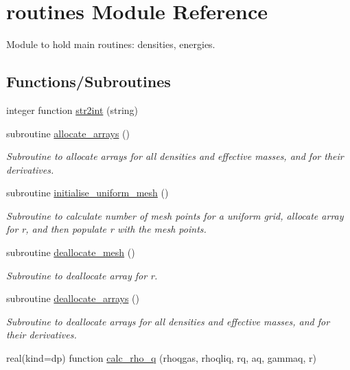 \hypertarget{namespaceroutines}{}\section{routines Module Reference}
\label{namespaceroutines}


Module to hold main routines\+: densities, energies.  


\subsection*{Functions/\+Subroutines}
\begin{DoxyCompactItemize}
\item 
integer function \mbox{\hyperlink{namespaceroutines_a8146fb4359e556bad19f882b8aabfc4b}{str2int}} (string)
\item 
subroutine \mbox{\hyperlink{namespaceroutines_a0d41e4cd4e61ac1463c75055bf784e8b}{allocate\+\_\+arrays}} ()
\begin{DoxyCompactList}\small\item\em Subroutine to allocate arrays for all densities and effective masses, and for their derivatives. \end{DoxyCompactList}\item 
subroutine \mbox{\hyperlink{namespaceroutines_a5caa9b33bdf3c960b6bb3bfa96771181}{initialise\+\_\+uniform\+\_\+mesh}} ()
\begin{DoxyCompactList}\small\item\em Subroutine to calculate number of mesh points for a uniform grid, allocate array for r, and then populate r with the mesh points. \end{DoxyCompactList}\item 
subroutine \mbox{\hyperlink{namespaceroutines_a27ad9ac802069004010c9759fecced92}{deallocate\+\_\+mesh}} ()
\begin{DoxyCompactList}\small\item\em Subroutine to deallocate array for r. \end{DoxyCompactList}\item 
subroutine \mbox{\hyperlink{namespaceroutines_ae7bc716d30ef4d9ecece5daa22324b77}{deallocate\+\_\+arrays}} ()
\begin{DoxyCompactList}\small\item\em Subroutine to deallocate arrays for all densities and effective masses, and for their derivatives. \end{DoxyCompactList}\item 
real(kind=dp) function \mbox{\hyperlink{namespaceroutines_a407a248748ce7c0e2e9e5dce03cc9415}{calc\+\_\+rho\+\_\+q}} (rhoqgas, rhoqliq, rq, aq, gammaq, r)

\end{DoxyCompactItemize}
